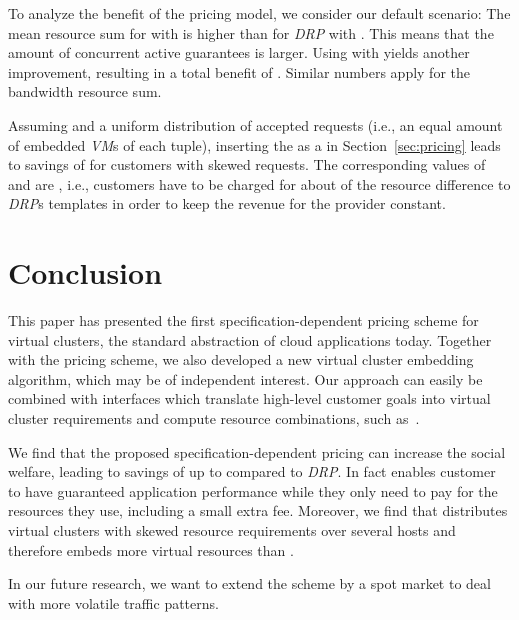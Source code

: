 \documentclass{sig-alternate-per}
\begin{document}
To analyze the benefit of the pricing model, we consider our default scenario:
The mean resource sum for  with  is  higher than for \emph{DRP} with . This means that the
amount of concurrent active guarantees is  larger. Using  with  yields another  improvement,
resulting in a total benefit of . Similar numbers apply for the bandwidth resource sum.

Assuming  and a uniform distribution of accepted requests (i.e., an equal amount of embedded \emph{VM}s
of each  tuple), inserting the  as a  in
Section~\ref{sec:pricing} leads to savings of  for customers with skewed requests. The corresponding values of
 and  are , i.e., customers have to be charged for about  of the resource
difference to \emph{DRP}s templates in order to keep the revenue for the provider constant.

\section{Conclusion}\label{sec:conclusion}

This paper has presented the first specification-dependent pricing scheme for virtual clusters,
the standard abstraction of cloud applications today. Together with the pricing scheme,
we also developed a new virtual cluster embedding algorithm, which may be of independent interest.
Our approach can easily be combined with interfaces which translate high-level
customer goals into virtual cluster requirements and compute
resource combinations, such as~\cite{short-gapbridge}.

We find that the proposed specification-dependent pricing can increase the social welfare,
leading to savings of up to
 compared to \emph{DRP}. In fact  enables customer to have guaranteed application performance while they
only need to pay for the resources they use, including a small extra fee.
Moreover, we find that  distributes virtual clusters with skewed resource requirements over several
hosts and therefore embeds  more virtual resources than .

In our future research, we want to extend the  scheme
by a spot market to deal with more volatile traffic patterns.
\end{document}
